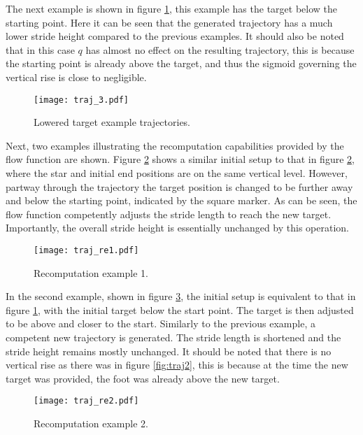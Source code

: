                 The next example is shown in figure \ref{fig:traj3}, this example has the target below the starting point. Here it can be seen that the generated trajectory has a much lower stride height compared to the previous examples. It should also be noted that in this case \(q\) has almost no effect on the resulting trajectory, this is because the starting point is already above the target, and thus the sigmoid governing the vertical rise is close to negligible.
                \begin{figure}[h]
                    \centering
                    \texttt{[image: traj\_3.pdf]}
                    \caption{Lowered target example trajectories.}
                    \label{fig:traj3}
                \end{figure}

                \noindent
                Next, two examples illustrating the recomputation capabilities provided by the flow function are shown. Figure \ref{fig:traj_re1} shows a similar initial setup to that in figure \ref{fig:traj_re1}, where the star and initial end positions are on the same vertical level. However, partway through the trajectory the target position is changed to be further away and below the starting point, indicated by the square marker. As can be seen, the flow function competently adjusts the stride length to reach the new target. Importantly, the overall stride height is essentially unchanged by this operation.
                \begin{figure}[h]
                    \centering
                    \texttt{[image: traj\_re1.pdf]}
                    \caption{Recomputation example 1.}
                    \label{fig:traj_re1}
                \end{figure}

                \noindent
                In the second example, shown in figure \ref{fig:traj_re2}, the initial setup is equivalent to that in figure \ref{fig:traj3}, with the initial target below the start point. The target is then adjusted to be above and closer to the start. Similarly to the previous example, a competent new trajectory is generated. The stride length is shortened and the stride height remains mostly unchanged. It should be noted that there is no vertical rise as there was in figure \ref{fig:traj2}, this is because at the time the new target was provided, the foot was already above the new target.
                \begin{figure}[h]
                    \centering
                    \texttt{[image: traj\_re2.pdf]}
                    \caption{Recomputation example 2.}
                    \label{fig:traj_re2}
                \end{figure}
                
                